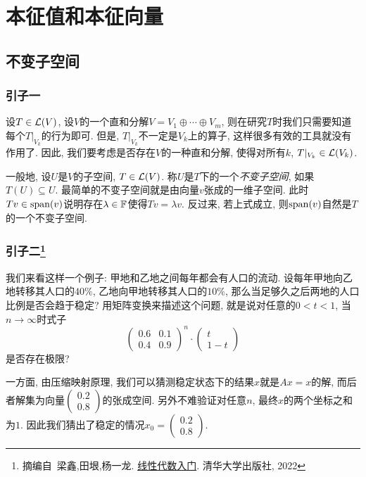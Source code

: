 \chapter{本征值和本征向量}

\section{不变子空间}

\subsection*{引子一}

设$T \in \mathcal{L} (V)$, 设$V$的一个直和分解$V=V_1 \oplus \cdots \oplus V_m$, 则在研究$T$时我们只需要知道每个$T|_{V_k}$的行为即可. 但是, $T|_{V_k}$不一定是$V_k$上的算子, 这样很多有效的工具就没有作用了. 因此, 我们要考虑是否存在$V$的一种直和分解, 使得对所有$k$, $T|_{V_k} \in \mathcal{L} (V_k)$. 

一般地, 设$U$是$V$的子空间, $T\in \mathcal{L} (V)$. 称$U$是$T$下的一个\textit{不变子空间}, 如果$T(U) \subseteq U$. 最简单的不变子空间就是由向量$v$张成的一维子空间. 此时$Tv \in \operatorname{span} (v)$说明存在$\lambda \in \mathbb{F}$使得$Tv=\lambda v$. 反过来, 若上式成立, 则$\operatorname{span} (v)$自然是$T$的一个不变子空间. 

\subsection*{引子二\footnote{摘编自~梁鑫,田垠,杨一龙. \underline{线性代数入门}. 清华大学出版社, 2022}}

我们来看这样一个例子: 甲地和乙地之间每年都会有人口的流动. 设每年甲地向乙地转移其人口的$40 \%$, 乙地向甲地转移其人口的$10 \%$, 那么当足够久之后两地的人口比例是否会趋于稳定? 用矩阵变换来描述这个问题, 就是说对任意的$0<t<1$, 当$n\to \infty$时式子$$
\begin{pmatrix}
 0.6 & 0.1\\
 0.4 & 0.9
\end{pmatrix}^n \cdot \begin{pmatrix}
t \\
1-t
\end{pmatrix}$$
是否存在极限? 

一方面, 由压缩映射原理, 我们可以猜测稳定状态下的结果$x$就是$Ax=x$的解, 而后者解集为向量$\begin{pmatrix}
0.2 \\ 0.8
\end{pmatrix}$的张成空间. 另外不难验证对任意$n$, 最终$x$的两个坐标之和为$1$. 因此我们猜出了稳定的情况$x_0=\begin{pmatrix}
0.2 \\ 0.8
\end{pmatrix}$. 

